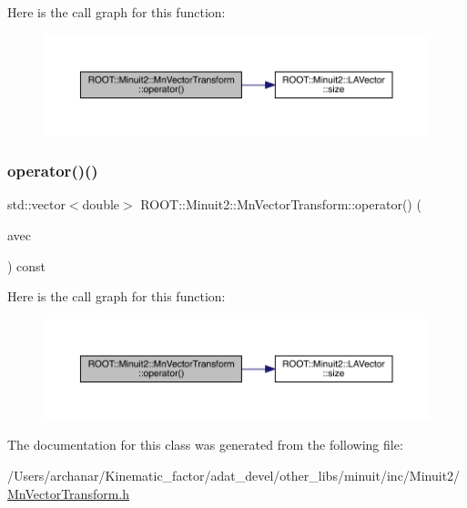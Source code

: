 Here is the call graph for this function\+:
\nopagebreak
\begin{figure}[H]
\begin{center}
\leavevmode
\includegraphics[width=350pt]{d1/d58/classROOT_1_1Minuit2_1_1MnVectorTransform_a2b16b519635ee775a78d3f62663bef89_cgraph}
\end{center}
\end{figure}
\mbox{\label{classROOT_1_1Minuit2_1_1MnVectorTransform_a2b16b519635ee775a78d3f62663bef89}} 
\subsubsection{\texorpdfstring{operator()()}{operator()()}\hspace{0.1cm}{\footnotesize\ttfamily [2/2]}}
{\footnotesize\ttfamily std\+::vector$<$double$>$ R\+O\+O\+T\+::\+Minuit2\+::\+Mn\+Vector\+Transform\+::operator() (\begin{DoxyParamCaption}\item[{const \mbox{\hyperlink{namespaceROOT_1_1Minuit2_a62ed97730a1ca8d3fbaec64a19aa11c9}{Mn\+Algebraic\+Vector}} \&}]{avec }\end{DoxyParamCaption}) const\hspace{0.3cm}{\ttfamily [inline]}}

Here is the call graph for this function\+:
\nopagebreak
\begin{figure}[H]
\begin{center}
\leavevmode
\includegraphics[width=350pt]{d1/d58/classROOT_1_1Minuit2_1_1MnVectorTransform_a2b16b519635ee775a78d3f62663bef89_cgraph}
\end{center}
\end{figure}


The documentation for this class was generated from the following file\+:\begin{DoxyCompactItemize}
\item 
/\+Users/archanar/\+Kinematic\+\_\+factor/adat\+\_\+devel/other\+\_\+libs/minuit/inc/\+Minuit2/\mbox{\hyperlink{other__libs_2minuit_2inc_2Minuit2_2MnVectorTransform_8h}{Mn\+Vector\+Transform.\+h}}\end{DoxyCompactItemize}
